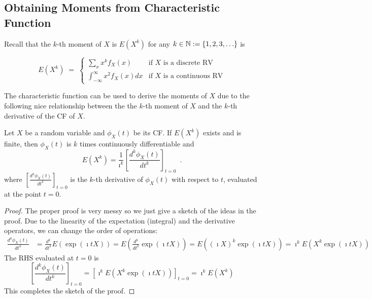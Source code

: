 \subsection{Obtaining Moments from Characteristic Function}

Recall that the $k$-th moment of $X$ is $E(X^k)$ for any $k \in \mathbb{N}:=\{1,2,3,\ldots\}$ is
\begin{framed}
\[
E(X^k)\; =\;
\begin{cases}
\displaystyle \sum_x x^k f_X(x) & \text{if $X$ is a discrete RV}\\[12pt]
\displaystyle \int_{-\infty}^{\infty} x^2 f_X(x) dx & \text{if $X$ is a continuous RV}
\end{cases}
\]
\end{framed}

The characteristic function can be used to derive the moments of $X$ due to the following nice relationship between the the $k$-th moment of $X$ and the $k$-th derivative of the CF of $X$.

\begin{framed}
\begin{prop}[Moment \& CF.]
Let $X$ be a random variable and $\phi_X(t)$ be its CF.  
If $E(X^k)$ exists and is finite, then $\phi_X(t)$ is $k$ times continuously differentiable and
\begin{equation*}
E(X^k) = \frac{1}{\imath^k} \left[\frac{d^k \phi_X(t)}{dt^k}\right]_{t=0} \enspace .
\end{equation*}
where $\left[\frac{d^k \phi_X(t)}{dt^k}\right]_{t=0}$ is the $k$-th derivative of $\phi_X(t)$ with respect to $t$, evaluated at the point $t=0$.
\end{prop}
\end{framed}

\begin{proof}
The proper proof is very messy so we just give a sketch of the ideas in the proof.  
Due to the linearity of the expectation (integral) and the derivative operators, we can change the order of operations:
\begin{align*}
\frac{d^k \phi_X(t)}{dt^k}
&= \frac{d^k}{dt^k} E(\exp(\imath t X))
= E \left( \frac{d^k}{dt^k} \exp(\imath t X) \right)
= E \left( (\imath X)^k \exp(\imath t X) \right)
= \imath^k E \left( X^k \exp(\imath t X) \right)
\end{align*}
The RHS evaluated at $t=0$ is
\[
\left[ \frac{d^k \phi_X(t)}{dt^k} \right]_{t=0}
= \left[ \imath^k E \left( X^k \exp(\imath t X) \right) \right]_{t=0} 
= \imath^k E \left( X^k \right)
\]
This completes the sketch of the proof.
\end{proof}

